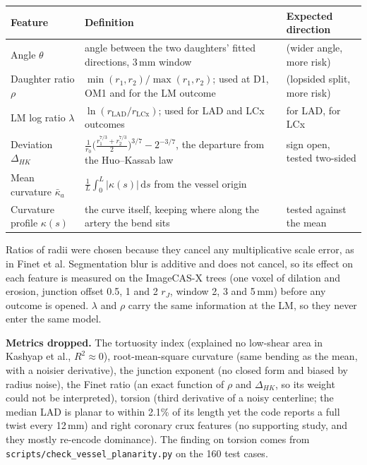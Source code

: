 \documentclass[11pt,a4paper]{article}
\begin{document}
\begin{center}
\small
\begin{tabular}{@{}p{3.3cm}p{5.6cm}p{5.6cm}@{}}
\toprule
Feature & Definition & Expected direction \\
\midrule
Angle $\theta$ & angle between the two daughters' fitted directions, 3\,mm window &  (wider angle, more risk) \\
Daughter ratio $\rho$ & $\min(r_1,r_2)/\max(r_1,r_2)$; used at D1, OM1 and for the LM outcome &  (lopsided split, more risk) \\
LM log ratio $\lambda$ & $\ln(r_\mathrm{LAD}/r_\mathrm{LCx})$; used for LAD and LCx outcomes & for LAD, for LCx \\
Deviation $\Delta_{HK}$ & $\frac{1}{r_0}\big(\frac{r_1^{7/3}+r_2^{7/3}}{2}\big)^{3/7}-2^{-3/7}$, the departure from the Huo--Kassab law & sign open, tested two-sided \\
Mean curvature $\bar\kappa_a$ & $\frac{1}{L}\int_0^L|\kappa(s)|\,\mathrm{d}s$ from the vessel origin & \\
Curvature profile $\kappa(s)$ & the curve itself, keeping where along the artery the bend sits & tested against the mean \\
\bottomrule
\end{tabular}
\end{center}

Ratios of radii were chosen because they cancel any multiplicative scale error, as in Finet et al.
Segmentation blur is additive and does not cancel, so its effect on each feature is measured on the
ImageCAS-X trees (one voxel of dilation and erosion, junction offset 0.5, 1 and 2 $r_J$, window 2, 3 and
5\,mm) before any outcome is opened. $\lambda$ and $\rho$ carry the same information at the LM, so
they never enter the same model.

\textbf{Metrics dropped.} The tortuosity index (explained no low-shear area in Kashyap et al.,
$R^2\approx 0$), root-mean-square curvature (same bending as the mean, with a noisier derivative), the
junction exponent (no closed form and biased by radius noise), the Finet ratio (an exact function of
$\rho$ and $\Delta_{HK}$, so its weight could not be interpreted), torsion (third derivative of a noisy
centerline; the median LAD is planar to within 2.1\% of its length yet the code reports a full twist every
12\,mm) and right coronary crux features (no supporting study, and they mostly re-encode dominance).
The finding on torsion comes from \texttt{scripts/check\_vessel\_planarity.py} on the 160 test cases.
\end{document}
